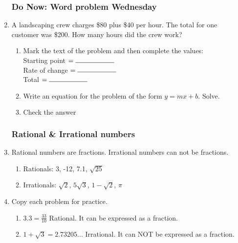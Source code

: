 \documentclass[12pt, oneside]{article}
\begin{document}
  \begin{enumerate}
    \subsubsection*{Do Now: Word problem Wednesday}

  \item A landscaping crew charges \$80 plus \$40 per hour. The total for one customer was \$200. How many hours did the crew work?
  \begin{enumerate}
    \item Mark the text of the problem and then complete the values:\\[0.5cm]
    Starting point $= \rule{2cm}{0.15mm}$ \\[0.5cm]
    Rate of change $= \rule{2cm}{0.15mm}$ \\[0.5cm]
    Total $= \rule{2cm}{0.15mm}$ \\

    \item Write an equation for the problem of the form $y=mx+b$. Solve.\\[2.5cm]
    \item Check the answer \vspace{2.5cm}
  \end{enumerate}

  \subsubsection*{Rational \& Irrational numbers}

    \item Rational numbers are fractions. Irrational numbers can not be fractions.
    \begin{enumerate}
      \item Rationals: 3, -12, 7.1, $\sqrt{25}$
      \item Irrationals: $\sqrt{2}$, $5\sqrt{3}$, $1-\sqrt{2}$, $\pi$
    \end{enumerate} \vspace{0.5cm}

    \item Copy each problem for practice.
      \begin{enumerate}
        \item $3.3=\frac{33}{10}$ \hspace{1cm} Rational. It can be expressed as a fraction. \vspace{2cm}
        \item $1+\sqrt{3}=2.73205...$ Irrational.  \hspace{0.5cm} It can NOT be expressed as a fraction. \vspace{2cm}
      \end{enumerate}

\end{enumerate}
\end{document}
